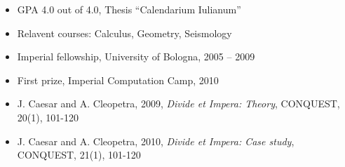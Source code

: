 \documentclass[a4paper,12pt,roman]{resume}
\begin{document}
\begin{itemize}
\item GPA 4.0 out of 4.0, Thesis ``Calendarium Iulianum''
\item Relavent courses: Calculus, Geometry, Seismology
\end{itemize}


\begin{itemize}
\item Imperial fellowship, University of Bologna, 2005 -- 2009
\item First prize, Imperial Computation Camp, 2010
\end{itemize}

\begin{itemize}
\item J. Caesar and A. Cleopetra, 2009, \textit{Divide et Impera: Theory}, CONQUEST, 20(1), 101-120
\item J. Caesar and A. Cleopetra, 2010, \textit{Divide et Impera: Case study}, CONQUEST, 21(1), 101-120
\end{itemize}

\end{document}
